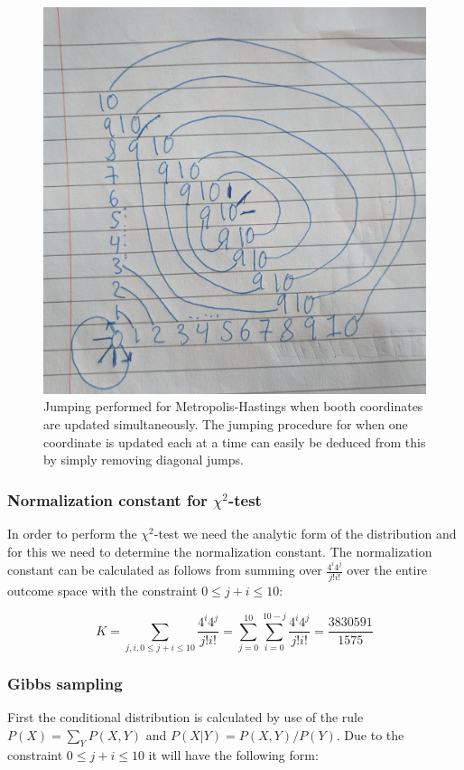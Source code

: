 \begin{figure}[H]
    \centering
    \includegraphics[width=\linewidth]{figures/pic1.jpg}
    \caption{Jumping performed for Metropolis-Hastings when booth coordinates are updated simultaneously. The jumping procedure for when one coordinate is updated each at a time can easily be deduced from this by simply removing diagonal jumps.}
    \label{fig:ex62}
\end{figure}


\subsubsection*{Normalization constant for $\chi^2$-test}
In order to perform the $\chi^2$-test we need the analytic form of the distribution and for this we need to determine the normalization constant. The normalization constant can be calculated as follows from summing over $\frac{4^i4^j}{j!i!}$ over the entire outcome space with the constraint $0 \leq j + i \leq 10$:

$$
K = \sum_{j,i, 0 \leq j+i \leq 10}\frac{4^i4^j}{j!i!}  =  \sum_{j=0}^{10}\sum_{i=0}^{10-j}\frac{4^i4^j}{j!i!} = \frac{3830591}{1575}
$$


\subsubsection*{Gibbs sampling}
First the conditional distribution is calculated by use of the rule $P(X)= \sum_{Y}P(X,Y)$ and $P(X|Y) = P(X,Y)/P(Y)$.  Due to the constraint $0 \leq j + i \leq 10$ it will have the following form:


